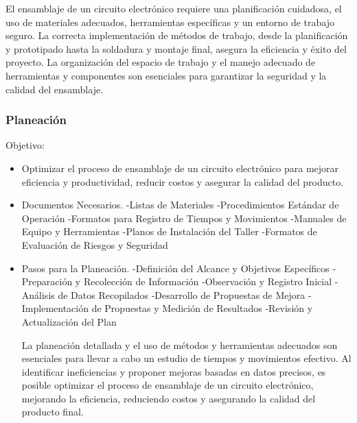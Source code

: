     El ensamblaje de un circuito electrónico requiere una planificación cuidadosa, el uso de materiales adecuados, herramientas específicas y un entorno de trabajo seguro. La correcta implementación de métodos de trabajo, desde la planificación y prototipado hasta la soldadura y montaje final, asegura la eficiencia y éxito del proyecto. La organización del espacio de trabajo y el manejo adecuado de herramientas y componentes son esenciales para garantizar la seguridad y la calidad del ensamblaje.
    
    \subsubsection{Planeación}
    Objetivo:
    \begin{itemize}
    \item Optimizar el proceso de ensamblaje de un circuito electrónico para mejorar eficiencia y productividad, reducir costos y asegurar la calidad del producto.
    \item Documentos Necesarios.
    -Listas de Materiales
    -Procedimientos Estándar de Operación
    -Formatos para Registro de Tiempos y Movimientos
    -Manuales de Equipo y Herramientas
    -Planos de Instalación del Taller
    -Formatos de Evaluación de Riesgos y Seguridad
    
    \item Pasos para la Planeación.
    -Definición del Alcance y Objetivos Específicos
    -Preparación y Recolección de Información
    -Observación y Registro Inicial
    -Análisis de Datos Recopilados
    -Desarrollo de Propuestas de Mejora
    -Implementación de Propuestas y Medición de Resultados
    -Revisión y Actualización del Plan
    
    La planeación detallada y el uso de métodos y herramientas adecuados son esenciales para llevar a cabo un estudio de tiempos y movimientos efectivo. Al identificar ineficiencias y proponer mejoras basadas en datos precisos, es posible optimizar el proceso de ensamblaje de un circuito electrónico, mejorando la eficiencia, reduciendo costos y asegurando la calidad del producto final.
    \end{itemize}
    
    
